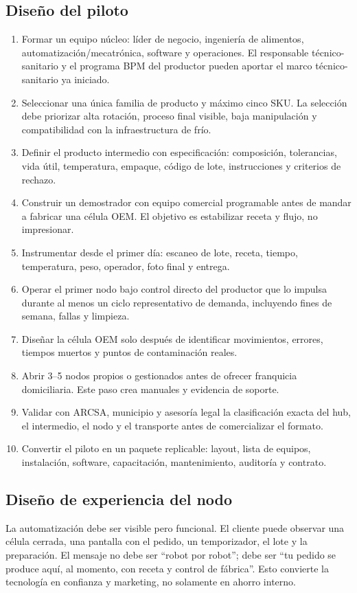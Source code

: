 \documentclass[11pt,a4paper]{article}
\begin{document}
\subsection{Diseño del piloto}
\begin{enumerate}[leftmargin=2em]
\item Formar un equipo núcleo: líder de negocio, ingeniería de alimentos, automatización/mecatrónica,
software y operaciones. El responsable técnico-sanitario y el programa BPM del productor pueden aportar
el marco técnico-sanitario ya iniciado.
\item Seleccionar una única familia de producto y máximo cinco SKU. La selección debe priorizar alta
rotación, proceso final visible, baja manipulación y compatibilidad con la infraestructura de frío.
\item Definir el producto intermedio con especificación: composición, tolerancias, vida útil,
temperatura, empaque, código de lote, instrucciones y criterios de rechazo.
\item Construir un demostrador con equipo comercial programable antes de mandar a fabricar una célula
OEM. El objetivo es estabilizar receta y flujo, no impresionar.
\item Instrumentar desde el primer día: escaneo de lote, receta, tiempo, temperatura, peso, operador,
foto final y entrega.
\item Operar el primer nodo bajo control directo del productor que lo impulsa durante al menos un ciclo
representativo de demanda, incluyendo fines de semana, fallas y limpieza.
\item Diseñar la célula OEM solo después de identificar movimientos, errores, tiempos muertos y puntos de
contaminación reales.
\item Abrir 3--5 nodos propios o gestionados antes de ofrecer franquicia domiciliaria. Este paso crea
manuales y evidencia de soporte.
\item Validar con ARCSA, municipio y asesoría legal la clasificación exacta del hub, el intermedio, el
nodo y el transporte antes de comercializar el formato.
\item Convertir el piloto en un paquete replicable: layout, lista de equipos, instalación, software,
capacitación, mantenimiento, auditoría y contrato.
\end{enumerate}

\subsection{Diseño de experiencia del nodo}
La automatización debe ser visible pero funcional. El cliente puede observar una célula cerrada, una
pantalla con el pedido, un temporizador, el lote y la preparación. El mensaje no debe ser “robot por
robot”; debe ser “tu pedido se produce aquí, al momento, con receta y control de fábrica”. Esto convierte
la tecnología en confianza y marketing, no solamente en ahorro interno.
\end{document}
